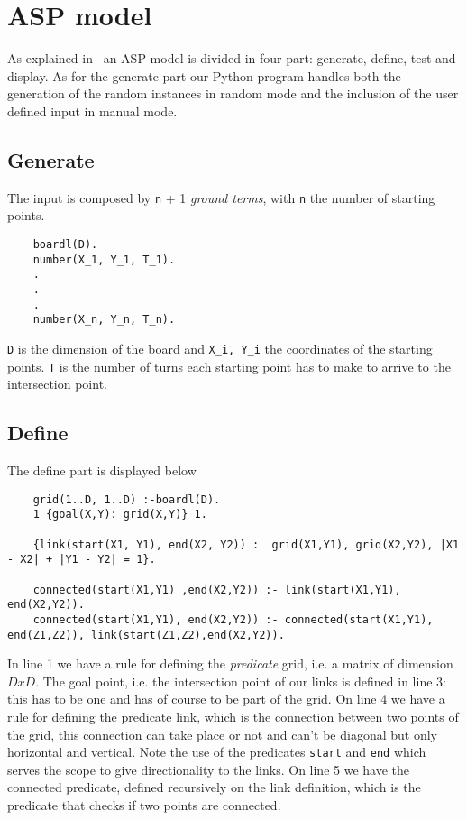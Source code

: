 \section{ASP model}
As explained in~\cite{ClingoGuide} an ASP model is divided in four part: generate, define, test and display.
As for the generate part our Python program handles both the generation of the random instances in random mode and the inclusion of the user defined input in manual mode.
\subsection{Generate}
The input is composed by \texttt{n} + 1 \emph{ground terms}, with \texttt{n} the number of starting points.
\begin{verbatim}
    boardl(D).
    number(X_1, Y_1, T_1).
    .
    .
    .
    number(X_n, Y_n, T_n).
\end{verbatim}
\texttt{D} is the dimension of the board and \texttt{X_i, Y_i} the coordinates of the starting points. \texttt{T} is the number of turns each starting point has to make to arrive to the intersection point.

\subsection{Define}
The define part is displayed below
\begin{verbatim}
    grid(1..D, 1..D) :-boardl(D).
    1 {goal(X,Y): grid(X,Y)} 1.
    
    {link(start(X1, Y1), end(X2, Y2)) :  grid(X1,Y1), grid(X2,Y2), |X1 - X2| + |Y1 - Y2| = 1}. 
    
    connected(start(X1,Y1) ,end(X2,Y2)) :- link(start(X1,Y1), end(X2,Y2)).
    connected(start(X1,Y1), end(X2,Y2)) :- connected(start(X1,Y1), end(Z1,Z2)), link(start(Z1,Z2),end(X2,Y2)). 
\end{verbatim}

In line 1 we have a rule for defining the \emph{predicate} grid, i.e. a matrix of dimension $DxD$. The goal point, i.e. the intersection point of our links is defined in line 3: this has to be one and has of course to be part of the grid.
On line 4 we have a rule for defining the predicate link, which is the connection between two points of the grid, this connection can take place or not and can't be diagonal but only horizontal and vertical. Note the use of the predicates \texttt{start} and \texttt{end} which serves the scope to give directionality to the links.
On line 5 we have the connected predicate, defined recursively on the link definition, which is the predicate that checks if two points are connected.
